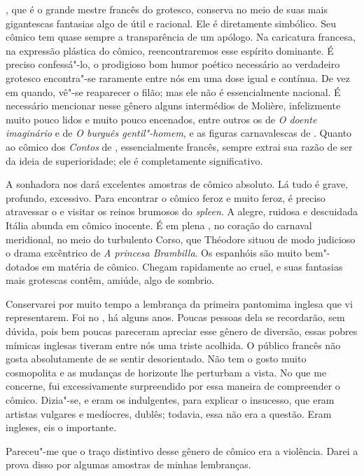 , que é o grande mestre francês do grotesco, conserva no meio de
suas mais gigantescas fantasias algo de útil e racional. Ele é
diretamente simbólico. Seu cômico tem quase sempre a transparência de
um apólogo. Na caricatura francesa, na expressão plástica do cômico,
reencontraremos esse espírito dominante. É preciso confessá"-lo, o
prodigioso bom humor poético necessário ao verdadeiro grotesco
encontra"-se raramente entre nós em uma dose igual e contínua. De vez em
quando, vê"-se reaparecer o filão; mas ele não é essencialmente
nacional. É necessário mencionar nesse gênero alguns intermédios de
Molière, infelizmente muito pouco lidos e muito pouco encenados, entre
outros os de \textit{O doente imaginário }e de \textit{O burguês
gentil"-homem}, e as figuras carnavalescas de . Quanto ao cômico
dos \textit{Contos }de , essencialmente francês, sempre extrai
sua razão de ser da ideia de superioridade; ele é completamente
significativo.

A sonhadora  nos dará excelentes amostras de cômico absoluto. Lá
tudo é grave, profundo, excessivo. Para encontrar o cômico feroz e
muito feroz, é preciso atravessar o  e
visitar os reinos brumosos do \textit{spleen}. A alegre, ruidosa e
descuidada Itália abunda em cômico inocente. É em plena , no
coração do carnaval meridional, no meio do turbulento Corso, que
Théodore  situou de modo judicioso o drama excêntrico de
\textit{A princesa Brambilla}. Os espanhóis são muito bem"-dotados em
matéria de cômico. Chegam rapidamente ao cruel, e suas fantasias mais
grotescas contêm, amiúde, algo de sombrio.

Conservarei por muito tempo a lembrança da primeira pantomima inglesa
que vi representarem. Foi no , há alguns anos.
Poucas pessoas dela se recordarão, sem dúvida, pois bem poucas
pareceram apreciar esse gênero de diversão, essas pobres mímicas
inglesas tiveram entre nós uma triste acolhida. O público francês não
gosta absolutamente de se sentir desorientado. Não tem o gosto muito
cosmopolita e as mudanças de horizonte lhe perturbam a vista. No que me
concerne, fui excessivamente surpreendido por essa maneira de
compreender o cômico. Dizia"-se, e eram os indulgentes, para explicar o
insucesso, que eram artistas vulgares e medíocres, dublês; todavia,
essa não era a questão. Eram ingleses, eis o importante.

Pareceu"-me que o traço distintivo desse gênero de cômico era a
violência. Darei a prova disso por algumas amostras de minhas
lembranças.

